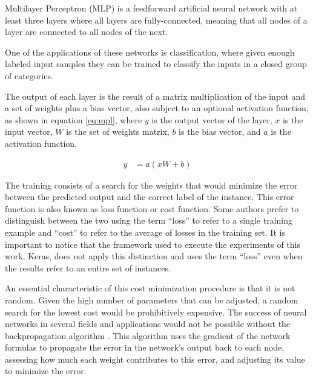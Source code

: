 Multilayer Perceptron (MLP)\cite{rosenblatt_perceptron:_1958} is a feedforward artificial neural network with at least three layers where all layers are fully-connected, meaning that all nodes of a layer are connected to all nodes of the next.

One of the applications of these networks is classification, where given enough labeled input samples they can be trained to classify the inputs in a closed group of categories.

The output of each layer is the result of a matrix multiplication of the input and a set of weights plus a bias vector, also subject to an optional activation function, as shown in equation \ref{eq:mpl}, where $y$ is the output vector of the layer, $x$ is the input vector, $W$ is the set of weights matrix, $b$ is the bias vector, and $a$ is the activation function.

\begin{align}
\label{eq:mpl}     
y &= a(x W + b)
\end{align}


The training consists of a search for the weights that would minimize the error between the predicted output and the correct label of the instance. This error function is also known as loss function or cost function. Some authors prefer to distinguish between the two using the term ``loss'' to refer to a single training example and ``cost'' to refer to the average of losses in the training set. It is important to notice that the framework used to execute the experiments of this work, Keras, does not apply this distinction and uses the term ``loss'' even when the results refer to an entire set of instances.

An essential characteristic of this cost minimization procedure is that it is not random. Given the high number of parameters that can be adjusted, a random search for the lowest cost would be prohibitively expensive. The success of neural networks in several fields and applications would not be possible without the backpropagation algorithm \cite{rumelhart_general_1986}. This algorithm uses the gradient of the network formulas to propagate the error in the network's output back to each node, assessing how much each weight contributes to this error, and adjusting its value to minimize the error.